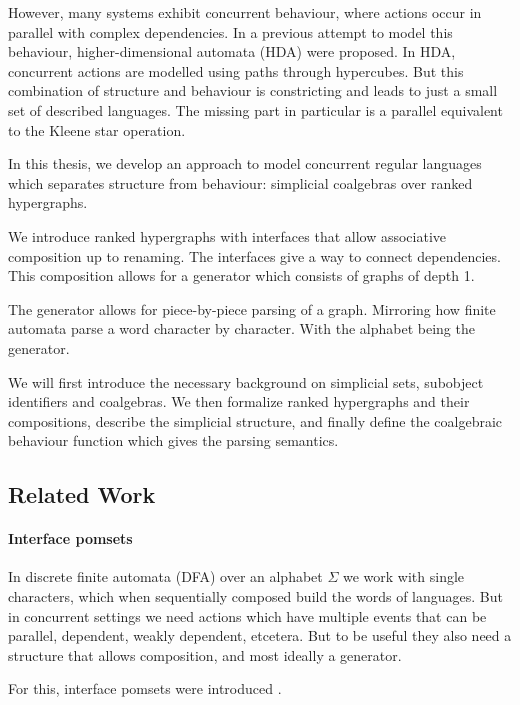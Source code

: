 \documentclass[12pt]{article}
\theoremstyle{definition}
\newcommand{\1}{\mathbbm{1}}
\begin{document}
However, many systems exhibit concurrent behaviour, where actions occur in parallel with complex dependencies. In a previous attempt to model this behaviour, higher-dimensional automata (HDA) were proposed. In HDA, concurrent actions are modelled using paths through hypercubes. But this combination of structure and behaviour is constricting and leads to just a small set of described languages. The missing part in particular is a parallel equivalent to the Kleene star operation.

In this thesis, we develop an approach to model concurrent regular languages which separates structure from behaviour: simplicial coalgebras over ranked hypergraphs. 

We introduce ranked hypergraphs with interfaces that allow associative composition up to renaming. The interfaces give a way to connect dependencies. This composition allows for a generator which consists of graphs of depth 1. 

The generator allows for piece-by-piece parsing of a graph. Mirroring how finite automata parse a word character by character. With the alphabet being the generator.

We will first introduce the necessary background on simplicial sets, subobject identifiers and coalgebras. We then formalize ranked hypergraphs and their compositions, describe the simplicial structure, and finally define the coalgebraic behaviour function which gives the parsing semantics.

\subsection{Related Work}

\paragraph{Interface pomsets}
In discrete finite automata (DFA) over an alphabet $\Sigma$ we work with single characters, which when sequentially composed build the words of languages. But in concurrent settings we need actions which have multiple events that can be parallel, dependent, weakly dependent, etcetera. But to be useful they also need a structure that allows composition, and most ideally a generator.

For this, interface pomsets were introduced \cite{ipomsets2024}. 
\end{document}
